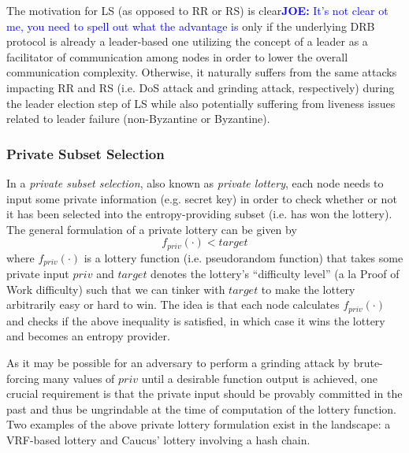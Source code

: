 \documentclass[letterpaper,twocolumn,10pt]{article}
\theoremstyle{definition}
\theoremstyle{remark}
\newcommand{\joenote}[1]{\textcolor{blue}{\textbf{JOE:} #1}}
\begin{document}
The motivation for LS (as opposed to RR or RS) is clear\joenote{It's not clear ot me, you need to spell out what the advantage is} only if the underlying DRB protocol is already a leader-based one utilizing the concept of a leader as a facilitator of communication among nodes in order to lower the overall communication complexity. Otherwise, it naturally suffers from the same attacks impacting RR and RS (i.e. DoS attack and grinding attack, respectively) during the leader election step of LS while also potentially suffering from liveness issues related to leader failure (non-Byzantine or Byzantine).

\subsubsection{Private Subset Selection}
\label{subsubsection:private-subset-selection}
In a \textit{private subset selection}, also known as \textit{private lottery}, each node needs to input some private information (e.g. secret key) in order to check whether or not it has been selected into the entropy-providing subset (i.e. has won the lottery). The general formulation of a private lottery can be given by
\[
f_{priv}(\cdot) < target
\]
where $f_{priv}(\cdot)$ is a lottery function (i.e. pseudorandom function) that takes some private input $priv$ and $target$ denotes the lottery's ``difficulty level'' (a la Proof of Work difficulty) such that we can tinker with $target$ to make the lottery arbitrarily easy or hard to win. The idea is that each node calculates $f_{priv}(\cdot)$ and checks if the above inequality is satisfied, in which case it wins the lottery and becomes an entropy provider.

As it may be possible for an adversary to perform a grinding attack by brute-forcing many values of $priv$ until a desirable function output is achieved, one crucial requirement is that the private input should be provably committed in the past and thus be ungrindable at the time of computation of the lottery function. Two examples of the above private lottery formulation exist in the landscape: a VRF-based lottery and Caucus' \cite{azouvi2018winning} lottery involving a hash chain.\\
\end{document}
